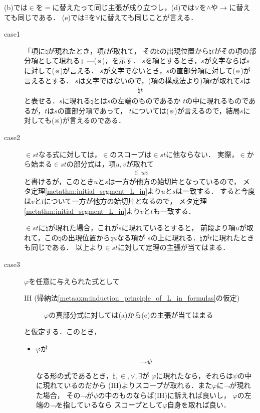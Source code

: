 	(b)では$\in$を$=$に替えたって同じ主張が成り立つし，(d)では$\vee$を$\wedge$や$\hspace{0.25em}\rightarrow\hspace{0.25em}$に替えても同じである．
	(e)では$\exists$を$\forall$に替えても同じことが言える．
	
	\begin{metaprf}\mbox{}
		\begin{description}
			\item[case1]
				「項に$\natural$が現れたとき，項$t$が取れて，
				その$\natural$の出現位置から$\natural t$がその項の部分項として現れる」---(※)，を示す．
				$s$を項とするとき，$s$が文字ならば$s$に対して(※)が言える．
				$s$が文字でないとき，$s$の直部分項に対して(※)が言えるとする．
				$s$は文字ではないので，(項の構成法より)項$t$が取れて$s$は
				\begin{align}
					\natural t
				\end{align}
				と表せる．$s$に現れる$\natural$とは$s$の左端のものであるか
				$t$の中に現れるものであるが，$t$は$s$の直部分項であって，
				$t$については(※)が言えるので，結局$s$に対しても(※)が言えるのである．
			
			
			\item[case2]
				$\in s t$なる式に対しては，$\in$のスコープは$\in s t$に他ならない．
				実際，$\in$から始まる$\in s t$の部分式は，項$u,v$が取れて
				\begin{align}
					\in u v
				\end{align}
				と書けるが，このとき$u$と$s$は一方が他方の始切片となっているので，
				メタ定理\ref{metathm:initial_segment_L_in}より$u$と$s$は一致する．
				すると今度は$v$と$t$について一方が他方の始切片となるので，
				メタ定理\ref{metathm:initial_segment_L_in}より$v$と$t$も一致する．
				
				$\in s t$に$\natural$が現れた場合，これが$s$に現れているとすると，
				前段より項$u$が取れて，この$\natural$の出現位置から$\natural u$なる項が
				$s$の上に現れる．$\natural$が$t$に現れたときも同じである．
				以上より$\in s t$に対して定理の主張が当てはまる．
					
			\item[case3]
				$\varphi$を任意に与えられた式として
				\begin{description}
					\item[IH (帰納法\ref{metaaxm:induction_principle_of_L_in_formulas}の仮定)]
					$\varphi$の真部分式に対しては(a)から(e)の主張が当てはまる
				\end{description}
				と仮定する．このとき，
				\begin{itemize}
					\item $\varphi$が
						\begin{align}
							\rightharpoondown\hspace{-0.25em} \psi
						\end{align}
						なる形の式であるとき，$\natural,\in,\vee,\exists$が
						$\varphi$に現れたなら，それらは$\psi$の中に現れているのだから
						(IH)よりスコープが取れる．また$\varphi$に$\rightharpoondown\hspace{-0.25em}$が現れた場合，
						その$\rightharpoondown\hspace{-0.25em}$が$\psi$の中のものならば(IH)に訴えれば良いし，
						$\varphi$の左端の$\rightharpoondown\hspace{-0.25em}$を指しているなら
						スコープとして$\varphi$自身を取れば良い．
						

\end{itemize}
\end{description}
\end{metaprf}
